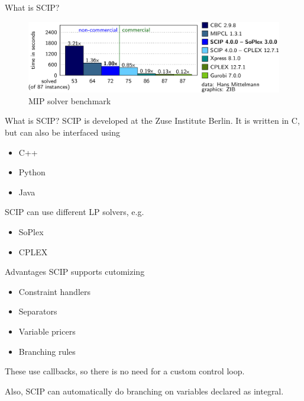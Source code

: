 \documentclass[fleqn]{beamer}
\begin{document}
    \begin{frame}{What is SCIP?}
        \begin{figure}
            \includegraphics{comparison}
            \caption{MIP solver benchmark}
        \end{figure}
    \end{frame}

    \begin{frame}{What is SCIP?}
        SCIP is developed at the Zuse Institute Berlin.
        It is written in C, but can also be interfaced using
        \begin{itemize}
            \item C++
            \item Python
            \item Java
        \end{itemize}
    
        SCIP can use different LP solvers, e.g.
        \begin{itemize}
            \item SoPlex %
            \item CPLEX
        \end{itemize}
    \end{frame}

    \begin{frame}{Advantages}
        SCIP supports cutomizing
        \begin{itemize}
            \item Constraint handlers %
            \item Separators
            \item Variable pricers
            \item Branching rules
        \end{itemize}
        These use callbacks, so there is no need for a custom control loop.
        
        Also, SCIP can automatically do branching on variables declared as integral.
    \end{frame}
	
\end{document}
